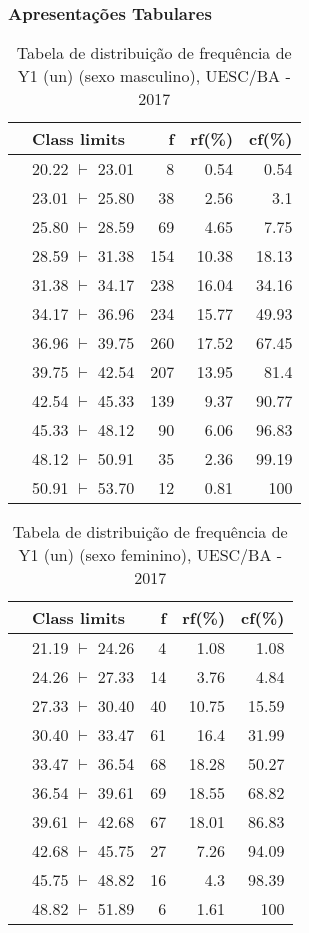\documentclass[a4paper, 10pt]{article}
\begin{document}
			\subsubsection{Apresentações Tabulares}				
				\begin{table}[!htb]
					\caption{Tabela de distribuição de frequência de Y1 (un) (sexo masculino), UESC/BA - 2017}
					\begin{tabular}{rlrrr}
						\hline
						 & Class limits & f & rf(\%) & cf(\%) \\
						\hline
						 & 20.22 $\vdash$  23.01 & 8 &  0.54 & 0.54 \\
						 & 23.01 $\vdash$  25.80 & 38 & 2.56 & 3.1 \\
						 & 25.80 $\vdash$  28.59 & 69 & 4.65 & 7.75 \\
						 & 28.59 $\vdash$  31.38 & 154 & 10.38 & 18.13 \\
						 & 31.38 $\vdash$  34.17 & 238 & 16.04 & 34.16 \\
						 & 34.17 $\vdash$  36.96 & 234 & 15.77 & 49.93 \\
						 & 36.96 $\vdash$  39.75 & 260 & 17.52 & 67.45 \\
						 & 39.75 $\vdash$  42.54 & 207 & 13.95 & 81.4 \\
						 & 42.54 $\vdash$  45.33 & 139 & 9.37 & 90.77 \\
						 & 45.33 $\vdash$  48.12 & 90 & 6.06 &  96.83 \\
						 & 48.12 $\vdash$  50.91 & 35 & 2.36 &  99.19 \\
						 & 50.91 $\vdash$  53.70 & 12 & 0.81 &  100 \\
						\hline
					\end{tabular}
				\end{table}
				\begin{table}[!htb]
					\caption{Tabela de distribuição de frequência de Y1 (un) (sexo feminino), UESC/BA - 2017}
					\begin{tabular}{rlrrr}
						\hline
						 & Class limits  & f  & rf(\%)  & cf(\%) \\
						\hline
						 & 21.19 $\vdash$  24.26 & 4 & 1.08 & 1.08 \\
						 & 24.26 $\vdash$  27.33 & 14 & 3.76 & 4.84 \\
						 & 27.33 $\vdash$  30.40 & 40 & 10.75 & 15.59 \\
						 & 30.40 $\vdash$  33.47 & 61 & 16.4 & 31.99 \\
						 & 33.47 $\vdash$  36.54 & 68 & 18.28 & 50.27 \\
						 & 36.54 $\vdash$  39.61 & 69 & 18.55 & 68.82 \\
						 & 39.61 $\vdash$  42.68 & 67 & 18.01 & 86.83 \\
						 & 42.68 $\vdash$  45.75 & 27 & 7.26 & 94.09 \\
						 & 45.75 $\vdash$  48.82 & 16 & 4.3 & 98.39 \\
						 & 48.82 $\vdash$  51.89 & 6 & 1.61 & 100 \\
						\hline
					\end{tabular}
				\end{table} \newpage
\end{document}
